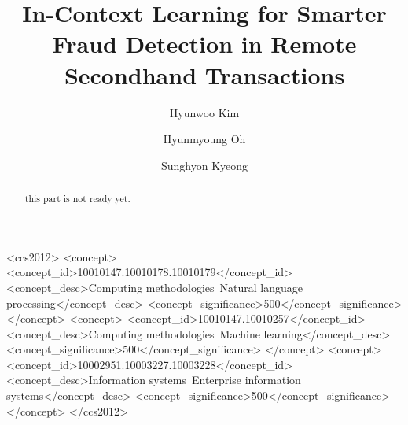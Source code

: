 \documentclass[sigconf]{acmart}
\begin{document}
\title{In-Context Learning for Smarter Fraud Detection in Remote Secondhand Transactions}



\author{Hyunwoo Kim}



\author{Hyunmyoung Oh}



\author{Sunghyon Kyeong}




\renewcommand{\shortauthors}{Kim et al.}

\begin{abstract}
this part is not ready yet.
\end{abstract}

\begin{CCSXML}
  <ccs2012>
    <concept>
      <concept_id>10010147.10010178.10010179</concept_id>
      <concept_desc>Computing methodologies~Natural language processing</concept_desc>
      <concept_significance>500</concept_significance>
    </concept>
    <concept>
      <concept_id>10010147.10010257</concept_id>
      <concept_desc>Computing methodologies~Machine learning</concept_desc>
      <concept_significance>500</concept_significance>
    </concept>
    <concept>
      <concept_id>10002951.10003227.10003228</concept_id>
      <concept_desc>Information systems~Enterprise information systems</concept_desc>
      <concept_significance>500</concept_significance>
    </concept>
  </ccs2012>
\end{CCSXML}
\end{document}
